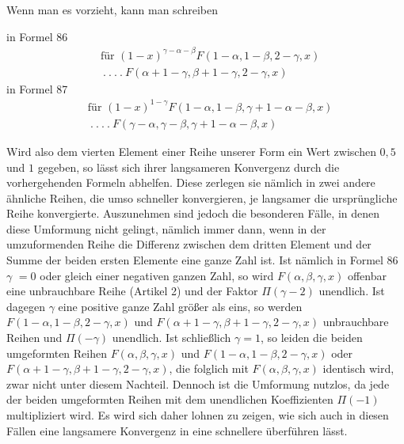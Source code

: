 Wenn man es vorzieht, kann man schreiben

in Formel 86
\[
\begin{aligned}&\text{für }(1-x)^{\gamma-\alpha-\beta}F(1-\alpha,1-\beta,2-\gamma,x)\\&\ .\ .\ .\ .\ F(\alpha+1-\gamma,\beta+1-\gamma,2-\gamma,x)\end{aligned}
\]
in Formel 87
\[
\begin{aligned}&\text{für }(1-x)^{1-\gamma}F(1-\alpha,1-\beta,\gamma+1-\alpha-\beta,x)\\&\ .\ .\ .\ .\ F(\gamma-\alpha,\gamma-\beta,\gamma+1-\alpha-\beta,x)\end{aligned}
\]


Wird also dem vierten Element einer Reihe unserer Form ein Wert zwischen $0{,}5$ und $1$ gegeben, so lässt sich ihrer langsameren Konvergenz durch die vorhergehenden Formeln abhelfen. Diese zerlegen sie nämlich in zwei andere ähnliche Reihen,
die umso schneller konvergieren, je langsamer die ursprüngliche Reihe konvergierte. Auszunehmen sind jedoch die besonderen Fälle, in denen diese Umformung nicht gelingt, nämlich immer dann, wenn in der umzuformenden Reihe die Differenz zwischen dem dritten Element und der Summe der beiden ersten Elemente eine ganze Zahl ist. Ist nämlich in Formel 86 $\gamma$ $=0$ oder gleich einer negativen ganzen Zahl, so wird $F(\alpha,\beta,\gamma,x)$ offenbar eine unbrauchbare Reihe (Artikel 2) und der Faktor $\Pi(\gamma-2)$ unendlich. Ist dagegen $\gamma$ eine positive ganze Zahl größer als eins, so werden $F(1-\alpha,1-\beta,2-\gamma,x)$ und $F(\alpha+1-\gamma,\beta+1-\gamma,2-\gamma,x)$ unbrauchbare Reihen und $\Pi(-\gamma)$ unendlich. Ist schließlich $\gamma=1$, so leiden die beiden umgeformten Reihen $F(\alpha,\beta,\gamma,x)$ und $F(1-\alpha,1-\beta,2-\gamma,x)$ oder $F(\alpha+1-\gamma,\beta+1-\gamma,2-\gamma,x)$, die folglich mit $F(\alpha,\beta,\gamma,x)$ identisch wird, zwar nicht unter diesem Nachteil. Dennoch ist die Umformung nutzlos, da jede der beiden umgeformten Reihen mit dem unendlichen Koeffizienten $\Pi(-1)$ multipliziert wird. Es wird sich daher lohnen zu zeigen, wie sich auch in diesen Fällen eine langsamere Konvergenz in eine schnellere überführen lässt.

